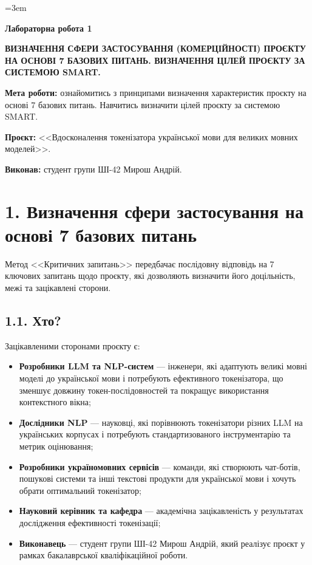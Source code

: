 \documentclass[14pt]{extarticle}
\begin{document}
\sloppy
\emergencystretch=3em

\begin{center}
\textbf{Лабораторна робота 1}

\medskip

\textbf{\MakeUppercase{Визначення сфери застосування (комерційності) проєкту на основі 7 базових питань. Визначення цілей проєкту за системою SMART.}}
\end{center}

\medskip

\textbf{Мета роботи:} ознайомитись з принципами визначення характеристик проєкту на основі 7 базових питань. Навчитись визначити цілей проєкту за системою SMART.

\textbf{Проєкт:} <<Вдосконалення токенізатора української мови для великих мовних моделей>>.

\textbf{Виконав:} студент групи ШІ-42 Мирош Андрій.

\section*{1. Визначення сфери застосування на основі 7 базових питань}

Метод <<Критичних запитань>> передбачає послідовну відповідь на 7 ключових запитань щодо проєкту, які дозволяють визначити його доцільність, межі та зацікавлені сторони.

\subsection*{1.1. Хто?}

Зацікавленими сторонами проєкту є:
\begin{itemize}
  \item \textbf{Розробники LLM та NLP-систем} --- інженери, які адаптують великі мовні моделі до української мови і потребують ефективного токенізатора, що зменшує довжину токен-послідовностей та покращує використання контекстного вікна;
  \item \textbf{Дослідники NLP} --- науковці, які порівнюють токенізатори різних LLM на українських корпусах і потребують стандартизованого інструментарію та метрик оцінювання;
  \item \textbf{Розробники україномовних сервісів} --- команди, які створюють чат-ботів, пошукові системи та інші текстові продукти для української мови і хочуть обрати оптимальний токенізатор;
  \item \textbf{Науковий керівник та кафедра} --- академічна зацікавленість у результатах дослідження ефективності токенізації;
  \item \textbf{Виконавець} --- студент групи ШІ-42 Мирош Андрій, який реалізує проєкт у рамках бакалаврської кваліфікаційної роботи.
\end{itemize}
\end{document}

